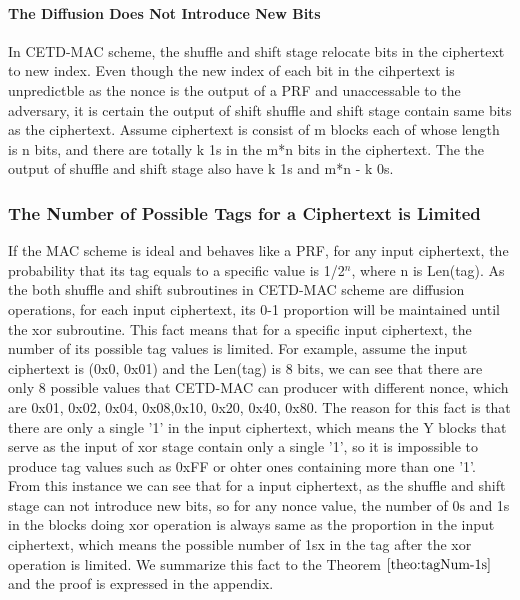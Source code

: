 \paragraph{The Diffusion Does Not Introduce New Bits}
In CETD-MAC scheme, the shuffle and shift stage relocate bits in the ciphertext to new index. Even though the new index of each bit in the cihpertext is unpredictble as the nonce is the output of a PRF and unaccessable to the adversary, it is certain the output of shift shuffle and shift stage contain same bits as the ciphertext. Assume ciphertext is consist of m blocks each of whose length is n bits, and there are totally k 1s in the m*n bits in the ciphertext. The the output of shuffle and shift stage also have k 1s and m*n - k 0s. 

\subsubsection{The Number of Possible Tags for a Ciphertext is Limited}\label{sect:bit-proportion}
If the MAC scheme is ideal and behaves like a PRF, for any input ciphertext, the probability that its tag equals to a specific value is 1/2$^n$, where n is Len(tag). 
As the both shuffle and shift subroutines in CETD-MAC scheme are diffusion operations, for each input ciphertext, its 0-1 proportion will be maintained until the xor subroutine. This fact means that for a specific input ciphertext, the number of its possible tag values is limited. For example, assume the input ciphertext is (0x0, 0x01) and the Len(tag) is 8 bits, we can see that there are only 8 possible values that CETD-MAC can producer with different nonce, which are {0x01, 0x02, 0x04, 0x08,0x10, 0x20, 0x40, 0x80}. The reason for this fact is that there are only a single '1' in the input ciphertext, which means the Y blocks that serve as the input of xor stage contain only a single '1', so it is impossible to produce tag values such as 0xFF or ohter ones containing more than one '1'. From this instance we can see that for a input ciphertext, as the shuffle and shift stage can not introduce new bits, so for any nonce value, the number of 0s and 1s in the blocks doing xor operation is always same as the proportion in the input ciphertext, which means the possible number of 1sx in the tag after the xor operation is limited. We summarize this fact to the Theorem $\ref{theo:tagNum-1s}$ and the proof is expressed in the appendix.
